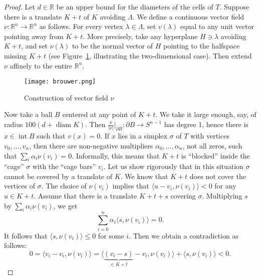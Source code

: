 \documentclass[12pt,a4paper,oneside]{amsart}
\theoremstyle{definition}
\theoremstyle{remark}
\numberwithin{equation}{section}
\DeclareMathOperator{\diam}{diam}
\DeclareMathOperator{\inte}{int}
\begin{document}
\begin{proof}
Let $d \in \mathbb{R}$ be an upper bound for the diameters of the cells of $T$.
Suppose there is a translate $K+t$ of $K$ avoiding $\Lambda$. We define a continuous vector field $\nu : \mathbb{R}^n \to \mathbb{R}^n$ as follows. For every vertex $\lambda \in \Lambda$, set $v(\lambda)$ equal to any unit vector pointing away from $K+t$. More precisely, take any hyperplane $H \ni \lambda$ avoiding $K+t$, and set $\nu(\lambda)$ to be the normal vector of $H$ pointing to the halfspace missing $K+t$ (see Figure~\ref{pic:brouwer}, illustrating the two-dimensional case). Then extend $\nu$ affinely to the entire $\mathbb{R}^n$.

\begin{figure}[h]
\centering
\texttt{[image: brouwer.png]}
\caption{Construction of vector field $\nu$}
\label{pic:brouwer}
\end{figure}

Now take a ball $B$ centered at any point of $K+t$. We take it large enough, say, of radius $100 (d + \diam K)$. Then $\frac{\nu}{|\nu|}\vert_{\partial B} : \partial B \to S^{n-1}$ has degree 1, hence there is $x \in \inte B$ such that $v(x) = 0$. If $x$ lies in a simplex $\sigma$ of $T$ with vertices $v_0, \ldots, v_n$, then there are non-negative multipliers $\alpha_0, \ldots, \alpha_n$, not all zeros, such that $\sum\limits_i \alpha_i \nu(v_i) = 0$. Informally, this means that $K+t$ is ``blocked'' inside the ``cage'' $\sigma$ with the ``cage bars'' $v_i$. Let us show rigorously that in this situation $\sigma$ cannot be covered by a translate of $K$.
We know that $K+t$ does not cover the vertices of $\sigma$. The choice of $\nu(v_i)$ implies that $\langle u - v_i, \nu(v_i) \rangle < 0$ for any $u \in K+t$. Assume that there is a translate $K+t+s$ covering $\sigma$. Multiplying $s$ by $\sum\limits_i \alpha_i \nu(v_i)$, we get
$$
\sum\limits_{i=0}^n \alpha_i \langle s, \nu(v_i) \rangle = 0.
$$
It follows that $\langle s, \nu(v_i) \rangle \le 0$ for some $i$. Then we obtain a contradiction as follows:
$$
0 = \langle v_i - v_i, \nu(v_i) \rangle = \langle \underbrace{(v_i-s)}_{\in K+t} - v_i, \nu(v_i) \rangle + \langle s, \nu(v_i) \rangle < 0.
$$
\end{proof}
\end{document}
